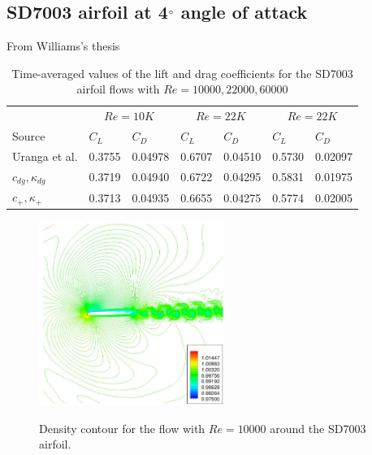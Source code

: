 \graphicspath{{figures_SD7003/}}%

\subsection{SD7003 airfoil at 4$^{\circ}$ angle of attack}
From Williams's thesis\cite{williams2013thesis}

\begin{table}[H]
\centering
\begin{tabular}{ l| l l| l l| l l} 
  
 &  \multicolumn{2}{|c|}{$Re = 10K$}  & \multicolumn{2}{|c|}{$Re = 22K$} & \multicolumn{2}{|c}{$Re = 22K$}  \\ 
 Source & $C_L$ & $C_D$ & $C_L$ & $C_D$ & $C_L$ & $C_D$   \\ 
\hline
 Uranga et al.\cite{uranga2011implicit} & 0.3755 & 0.04978 & 0.6707 & 0.04510 & 0.5730 & 0.02097  \\ 
$c_{dg},\kappa_{dg}$ & 0.3719 & 0.04940 & 0.6722 & 0.04295 & 0.5831 & 0.01975 \\ 
$c_{+},\kappa_{+}$ & 0.3713 & 0.04935 & 0.6655 & 0.04275 & 0.5774 & 0.02005  \\ 
 \end{tabular}
\caption{Time-averaged values of the lift and drag coefficients for the SD7003 airfoil flows with $Re = 10000, 22000, 60000$}
\label{table:sdAirfoilForce} 
 \end{table}



\begin{figure}
\centering
\includegraphics[height=60mm]{figure_935a} \\
\caption{Density contour for the flow with $Re = 10000$ around the SD7003 airfoil.}
\label{fig:figure_935a}
\end{figure}

